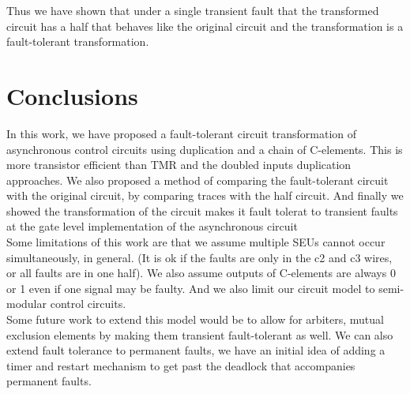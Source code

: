 \documentclass[12pt]{report}
\begin{document}
Thus we have shown that under a single transient fault that the transformed circuit has a half that behaves like the original circuit and the transformation is a fault-tolerant transformation.


\chapter{Conclusions}
In this work, we have proposed a fault-tolerant circuit transformation of asynchronous control circuits using duplication and a chain of C-elements.  This is more transistor efficient than TMR and the doubled inputs duplication approaches.  We also proposed a method of comparing the fault-tolerant circuit with the original circuit, by comparing traces with the half circuit.  And finally we showed the transformation of the circuit makes it fault tolerat to transient faults at the gate level implementation of the asynchronous circuit\\

Some limitations of this work are that we assume multiple SEUs cannot occur simultaneously, in general. (It is ok if the faults are only in the c2 and c3 wires, or all faults are in one half).  We also assume outputs of C-elements are always 0 or 1 even if one signal may be faulty.  And we also limit our circuit model to semi-modular control circuits.\\

Some future work to extend this model would be to allow for arbiters, mutual exclusion elements by making them transient fault-tolerant as well.  We can also extend fault tolerance to permanent faults, we have an initial idea of adding a timer and restart mechanism to get past the deadlock that accompanies permanent faults.




%


\end{document}
